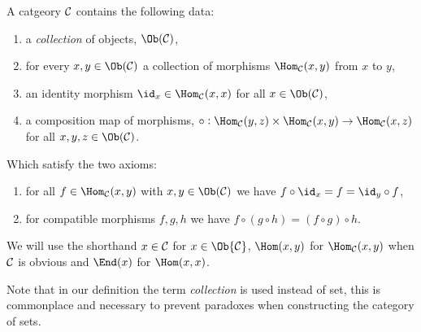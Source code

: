 \documentclass[../Year2.tex]{subfiles}
\begin{document}
\begin{definition}[Category]
    A catgeory $\mathcal{C}$ contains the following data: \begin{enumerate}
        \item a \textit{collection} of objects, $\Ob(\CCC)$,
        \item for every $x,y\in\Ob(\CCC)$ a collection of morphisms $\Hom_\CCC(x,y)$ from $x$ to $y$,
        \item an identity morphism $\id_x\in\Hom_\CCC(x,x)$ for all $x\in\Ob(\CCC)$,
        \item a composition map of morphisms, $\circ:\Hom_\CCC(y,z)\times\Hom_\CCC(x,y)\rightarrow\Hom_\CCC(x,z)$ for all $x,y,z\in\Ob(\CCC)$.
    \end{enumerate} Which satisfy the two axioms: \begin{enumerate}
        \item for all $f\in\Hom_\CCC(x,y)$ with $x,y\in\Ob(\CCC)$ we have $f\circ\id_x = f = \id_y\circ f$,
        \item for compatible morphisms $f,g,h$ we have $f\circ (g\circ h) = (f\circ g) \circ h$.
    \end{enumerate}
    We will use the shorthand $x\in\mathcal{C}$ for $x\in\Ob{\CCC}$, $\Hom(x,y)$ for $\Hom_\CCC(x,y)$ when $\mathcal{C}$ is obvious and $\End(x)$ for $\Hom(x,x)$.
\end{definition}

\begin{note}
    Note that in our definition the term \textit{collection} is used instead of set, this is commonplace and necessary to prevent paradoxes when constructing the category of sets.
\end{note}
\end{document}
